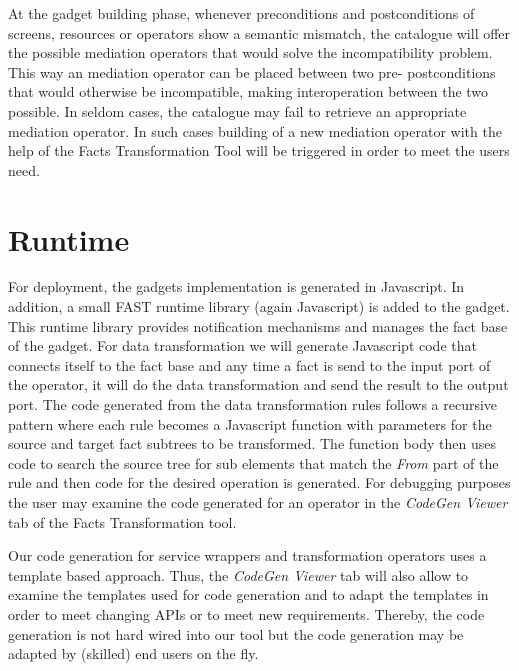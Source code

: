 At the gadget building phase, whenever preconditions and postconditions of screens, resources or operators show a semantic mismatch, the catalogue will offer the possible mediation operators that would solve the incompatibility problem. This way an mediation operator can be placed between two pre- postconditions that would otherwise be incompatible, making interoperation between the two possible. In seldom cases, the catalogue may fail to retrieve an appropriate mediation operator. In such cases building of a new mediation operator with the help of the Facts Transformation Tool will be triggered in order to meet the users need.  

\section{Runtime} 
\label{sec:runtime}
For deployment, the gadgets implementation is generated in Javascript. In addition, a small FAST runtime library (again Javascript) is added to the gadget. This runtime library provides notification mechanisms and manages the fact base of the gadget. For data transformation we will generate Javascript code that connects itself to the fact base and any time a fact is send to the input port of the operator, it will do the data transformation and send the result to the output port. The code generated from the data transformation rules follows a recursive pattern where each rule becomes a Javascript function with parameters for the source and target fact subtrees to be transformed. The function body then uses code to search the source tree for sub elements that match the \textit{From} part of the rule and then code for the desired operation is generated. For debugging purposes the user may examine the code generated for an operator in the \textit{CodeGen Viewer} tab of the Facts Transformation tool. 

Our code generation for service wrappers and transformation operators uses a template based approach. Thus, the \textit{CodeGen Viewer} tab will also allow to examine the templates used for code generation and to adapt the templates in order to meet changing APIs or to meet new requirements. Thereby, the code generation is not hard wired into our tool but the code generation may be adapted by (skilled) end users on the fly. 

